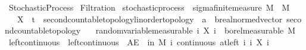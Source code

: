 %
\begin{isabellebody}%
%
%
\isadelimtheory
%
\endisadelimtheory
%
\isatagtheory
{}\isamarkupfalse%
\ Stochastic{\isacharunderscore}{\kern0pt}Process\isanewline
{}\ Filtration\isanewline
{}%
\endisatagtheory
{\isafoldtheory}%
%
\isadelimtheory
%
\endisadelimtheory
%
\isadelimdocument
%
\endisadelimdocument
%
\isatagdocument
%
\isamarkuptrue%
%
\endisatagdocument
{\isafolddocument}%
%
\isadelimdocument
%
\endisadelimdocument
{}\isamarkupfalse%
\ stochastic{\isacharunderscore}{\kern0pt}process\ {\isacharequal}{\kern0pt}\ sigma{\isacharunderscore}{\kern0pt}finite{\isacharunderscore}{\kern0pt}measure\ M\ \ M\ {\isacharplus}{\kern0pt}\isanewline
\ \ \ X\ {\isacharcolon}{\kern0pt}{\isacharcolon}{\kern0pt}\ {\isachardoublequoteopen}{\isacharprime}{\kern0pt}t\ {\isacharcolon}{\kern0pt}{\isacharcolon}{\kern0pt}\ {\isacharbraceleft}{\kern0pt}second{\isacharunderscore}{\kern0pt}countable{\isacharunderscore}{\kern0pt}topology{\isacharcomma}{\kern0pt}linorder{\isacharunderscore}{\kern0pt}topology{\isacharbraceright}{\kern0pt}\ {\isasymRightarrow}\ {\isacharprime}{\kern0pt}a\ {\isasymRightarrow}\ {\isacharprime}{\kern0pt}b{\isacharcolon}{\kern0pt}{\isacharcolon}{\kern0pt}{\isacharbraceleft}{\kern0pt}real{\isacharunderscore}{\kern0pt}normed{\isacharunderscore}{\kern0pt}vector{\isacharcomma}{\kern0pt}\ second{\isacharunderscore}{\kern0pt}countable{\isacharunderscore}{\kern0pt}topology{\isacharbraceright}{\kern0pt}{\isachardoublequoteclose}\isanewline
\ \ \ random{\isacharunderscore}{\kern0pt}variable{\isacharbrackleft}{\kern0pt}measurable{\isacharbrackright}{\kern0pt}{\isacharcolon}{\kern0pt}\ {\isachardoublequoteopen}{\isasymAnd}i{\isachardot}{\kern0pt}\ X\ i\ {\isasymin}\ borel{\isacharunderscore}{\kern0pt}measurable\ M{\isachardoublequoteclose}\isanewline
{}\isanewline
\isanewline
{}\isamarkupfalse%
\ left{\isacharunderscore}{\kern0pt}continuous\ \ {\isachardoublequoteopen}left{\isacharunderscore}{\kern0pt}continuous\ {\isacharequal}{\kern0pt}\ {\isacharparenleft}{\kern0pt}AE\ {\isasymxi}\ in\ M{\isachardot}{\kern0pt}\ {\isasymforall}i{\isachardot}{\kern0pt}\ continuous\ {\isacharparenleft}{\kern0pt}at{\isacharunderscore}{\kern0pt}left\ i{\isacharparenright}{\kern0pt}\ {\isacharparenleft}{\kern0pt}{\isasymlambda}i{\isachardot}{\kern0pt}\ X\ i\ {\isasymxi}{\isacharparenright}{\kern0pt}{\isacharparenright}{\kern0pt}{\isachardoublequoteclose}\isanewline

\end{isabellebody}
